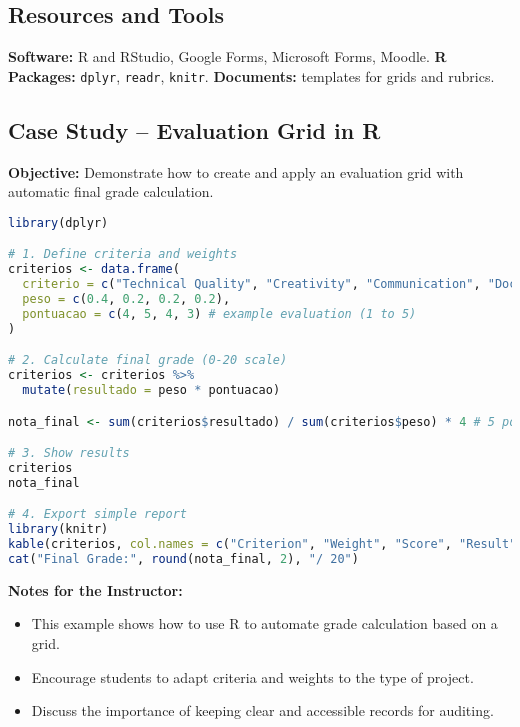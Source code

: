 \subsection{\textcolor{subsectionblue}{Resources and Tools}}
\begin{itemize}
  \textbf{Software:} R and RStudio, Google Forms, Microsoft Forms, Moodle.
  \textbf{R Packages:} \texttt{dplyr}, \texttt{readr}, \texttt{knitr}.
  \textbf{Documents:} templates for grids and rubrics.
\end{itemize}

\subsection{\textcolor{subsectionblue}{Case Study – Evaluation Grid in R}}
\textbf{Objective:} Demonstrate how to create and apply an evaluation grid with automatic final grade calculation.

\begin{lstlisting}[language=R]
library(dplyr)

# 1. Define criteria and weights
criterios <- data.frame(
  criterio = c("Technical Quality", "Creativity", "Communication", "Documentation"),
  peso = c(0.4, 0.2, 0.2, 0.2),
  pontuacao = c(4, 5, 4, 3) # example evaluation (1 to 5)
)

# 2. Calculate final grade (0-20 scale)
criterios <- criterios %>%
  mutate(resultado = peso * pontuacao)

nota_final <- sum(criterios$resultado) / sum(criterios$peso) * 4 # 5 points = 20 values

# 3. Show results
criterios
nota_final

# 4. Export simple report
library(knitr)
kable(criterios, col.names = c("Criterion", "Weight", "Score", "Result"))
cat("Final Grade:", round(nota_final, 2), "/ 20")
\end{lstlisting}

\textbf{Notes for the Instructor:}
\begin{itemize}
  \item This example shows how to use R to automate grade calculation based on a grid.
  \item Encourage students to adapt criteria and weights to the type of project.
  \item Discuss the importance of keeping clear and accessible records for auditing.
\end{itemize}